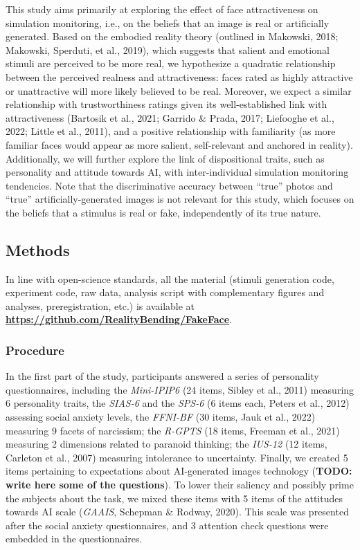 \documentclass[
  man,floatsintext]{apa6}
\begin{document}
This study aims primarily at exploring the effect of face attractiveness on simulation monitoring, i.e., on the beliefs that an image is real or artificially generated. Based on the embodied reality theory (outlined in Makowski, 2018; Makowski, Sperduti, et al., 2019), which suggests that salient and emotional stimuli are perceived to be more real, we hypothesize a quadratic relationship between the perceived realness and attractiveness: faces rated as highly attractive or unattractive will more likely believed to be real. Moreover, we expect a similar relationship with trustworthiness ratings given its well-established link with attractiveness (Bartosik et al., 2021; Garrido \& Prada, 2017; Liefooghe et al., 2022; Little et al., 2011), and a positive relationship with familiarity (as more familiar faces would appear as more salient, self-relevant and anchored in reality). Additionally, we will further explore the link of dispositional traits, such as personality and attitude towards AI, with inter-individual simulation monitoring tendencies. Note that the discriminative accuracy between ``true'' photos and ``true'' artificially-generated images is not relevant for this study, which focuses on the beliefs that a stimulus is real or fake, independently of its true nature.

\hypertarget{methods}{%
\subsection{Methods}\label{methods}}

In line with open-science standards, all the material (stimuli generation code, experiment code, raw data, analysis script with complementary figures and analyses, preregistration, etc.) is available at \href{https://github.com/RealityBending/FakeFace}{\textbf{https://github.com/RealityBending/FakeFace}}.

\hypertarget{procedure}{%
\subsubsection{Procedure}\label{procedure}}

In the first part of the study, participants answered a series of personality questionnaires, including the \emph{Mini-IPIP6} (24 items, Sibley et al., 2011) measuring 6 personality traits, the \emph{SIAS-6} and the \emph{SPS-6} (6 items each, Peters et al., 2012) assessing social anxiety levels, the \emph{FFNI-BF} (30 items, Jauk et al., 2022) measuring 9 facets of narcissism; the \emph{R-GPTS} (18 items, Freeman et al., 2021) measuring 2 dimensions related to paranoid thinking; the \emph{IUS-12} (12 items, Carleton et al., 2007) measuring intolerance to uncertainty. Finally, we created 5 items pertaining to expectations about AI-generated images technology (\textbf{TODO: write here some of the questions}). To lower their saliency and possibly prime the subjects about the task, we mixed these items with 5 items of the attitudes towards AI scale (\emph{GAAIS}, Schepman \& Rodway, 2020). This scale was presented after the social anxiety questionnaires, and 3 attention check questions were embedded in the questionnaires.
\end{document}
